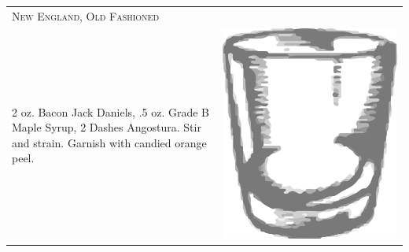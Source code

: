 \documentclass{article}
\begin{document}
\begin{tabular}{p{2in} p{0.5in}}
  \multicolumn{2}{p{3in}}{\centering\Huge\textsc{New England, Old Fashioned}} \\ 
  
   \vspace{-0.1in}2 oz. Bacon Jack Daniels, .5 oz. Grade B Maple Syrup, 2
    Dashes Angostura. Stir and strain. Garnish with candied orange
    peel. &  \vspace{-0.1in} \includegraphics{rocks_glass.png}
\end{tabular}
\end{document}
